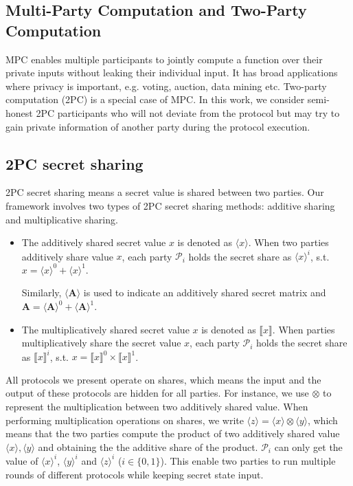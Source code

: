 \documentclass[letterpaper]{article} %
\begin{document}
    \subsection{Multi-Party Computation and Two-Party Computation}
    MPC enables multiple participants to jointly compute a function over their private inputs without leaking
	their individual input. It has broad applications where privacy is important, e.g. voting, auction,
	data mining etc. Two-party computation (2PC) is a special case of MPC.
    In this work, we consider semi-honest 2PC participants
    who will not deviate from the protocol but may try to gain private information of another party
		during the protocol execution.

    \subsection{2PC secret sharing}
    2PC secret sharing means a secret value is shared between two parties.
    Our framework involves two types of 2PC secret sharing methods:
    additive sharing and multiplicative sharing.
    \begin{itemize}
        \item
        The additively shared secret value $x$ is denoted as $\langle x\rangle $.
        When two parties additively share value $x$,
        each party $\mathcal{P}_{i}$ holds the secret share as $\langle x\rangle ^{i}$, s.t.
        $x=\langle x\rangle ^{0}+\langle x\rangle ^{1}$.

        Similarly, $\langle \mathbf{A}\rangle $ is used to indicate an additively shared secret matrix
        and $\mathbf{A} =\langle \mathbf{A}\rangle ^{0}+\langle \mathbf{A}\rangle ^{1}$.

        \item The multiplicatively shared secret value $x$ is denoted as $\llbracket x \rrbracket$.
        When parties multiplicatively share the secret value $x$,
        each party $\mathcal{P}_{i}$ holds the secret share as $\llbracket x \rrbracket ^{i}$, s.t.
        $x=\llbracket x \rrbracket ^{0}\times \llbracket x \rrbracket ^{1}$.

    \end{itemize}


    All protocols we present operate on shares, which means
    the input and the output of these protocols are hidden for all parties.
    For instance, we use $\otimes$ to represent the multiplication between two additively shared value.
    When performing multiplication operations on shares,
    we write $\langle z\rangle=\langle x\rangle\otimes  \langle y\rangle $,
    which means that the two parties compute the product of two additively shared value
    $\langle x\rangle, \langle y\rangle$ and obtaining the
    the additive share of the product.
    $\mathcal{P}_{i}$ can only get the value of $\langle x\rangle ^{i}$, $\langle y\rangle ^{i}$ and $\langle z\rangle ^{i}$ ($i \in \{0,1\}$).
    This enable two parties to run multiple rounds of different protocols while keeping secret state input.
\end{document}
